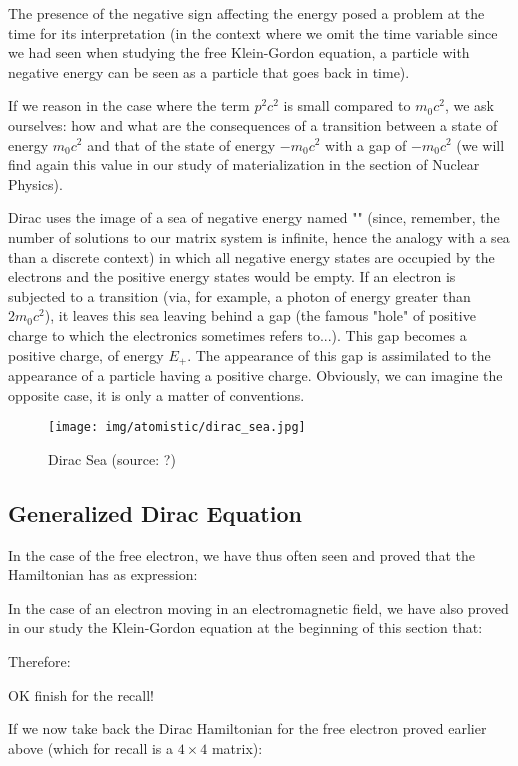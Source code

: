 	The presence of the negative sign affecting the energy posed a problem at the time for its interpretation (in the context where we omit the time variable since we had seen when studying the free Klein-Gordon equation, a particle with negative energy can be seen as a particle that goes back in time).

	If we reason in the case where the term $p^2c^2$ is small compared to $m_0c^2$, we ask ourselves: how and what are the consequences of a transition between a state of energy $m_0c^2$ and that of the state of energy $-m_0c^2$ with a gap of $-m_0c^2$ (we will find again this value in our study of materialization in the section of Nuclear Physics).

	Dirac uses the image of a sea of negative energy named "" (since, remember, the number of solutions to our matrix system is infinite, hence the analogy with a sea than a discrete context) in which all negative energy states are occupied by the electrons and the positive energy states would be empty. If an electron is subjected to a transition (via, for example, a photon of energy greater than $2m_0c^2$), it leaves this sea leaving behind a gap (the famous "hole" of positive charge to which the electronics sometimes refers to...). This gap becomes a positive charge, of energy $E_{+}$. The appearance of this gap is assimilated to the appearance of a particle having a positive charge. Obviously, we can imagine the opposite case, it is only a matter of conventions.
	\begin{figure}[H]
		\centering
		\texttt{[image: img/atomistic/dirac\_sea.jpg]}	
		\caption{Dirac Sea (source: ?)}
	\end{figure}
	
	\pagebreak
	\subsection{Generalized Dirac Equation}
	In the case of the free electron, we have thus often seen and proved that the Hamiltonian has as expression:
	
	In the case of an electron moving in an electromagnetic field, we have also proved in our study the Klein-Gordon equation at the beginning of this section that:
	
	Therefore:
	
	OK finish for the recall!
	
	If we now take back the Dirac Hamiltonian for the free electron proved earlier above (which for recall is a $4\times 4$ matrix):
	
